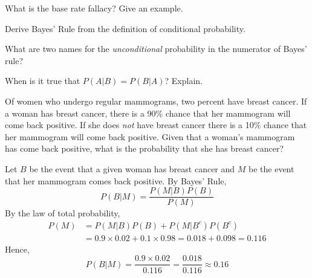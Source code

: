 \documentclass[addpoints,12pt]{exam}
\begin{document}
\begin{questions}



\question What is the base rate fallacy? Give an example.

\question Derive Bayes' Rule from the definition of conditional probability.

\question What are two names for the \emph{unconditional} probability in the numerator of Bayes' rule?

\question When is it true that $P(A|B) = P(B|A)$? Explain.

\question Of women who undergo regular mammograms, two percent have breast cancer. If a woman has breast cancer, there is a 90\% chance that her mammogram will come back positive. If she does \emph{not} have breast cancer there is a 10\% chance that her mammogram will come back positive. Given that a woman's mammogram has come back positive, what is the probability that she has breast cancer? 
	\begin{solution}
		 Let $B$ be the event that a given woman has breast cancer and $M$ be the event that her mammogram comes back positive. By Bayes' Rule,
		 		\[
          P(B|M) = \frac{P(M|B)P(B)}{P(M)}
        \]
	By the law of total probability, 
		 			\begin{align*}
		 			P(M) &= P(M|B)P(B) + P(M|B^c)P(B^c)\\
		 				&= 0.9 \times 0.02 + 0.1 \times 0.98  = 0.018 + 0.098 = 0.116
		 			\end{align*}
		 	Hence,
		 		\[
          P(B|M) = \frac{0.9 \times 0.02}{0.116} = \frac{0.018}{0.116} \approx 0.16
        \]
	\end{solution}


\end{questions}
\end{document}
